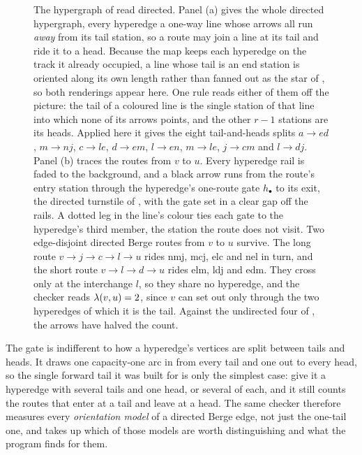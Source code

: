 \begin{figure}[htbp]
{\begin{tikzpicture}
\end{tikzpicture}}
\caption[Directed Berge routes on a whole hypergraph]{The hypergraph
of  read directed. Panel (a) gives the whole directed
hypergraph, every hyperedge a one-way line whose arrows all run \emph{away} from
its tail station, so a route may join a line at its tail and ride it to a head.
Because the map keeps each hyperedge on the track it already occupied, a line
whose tail is an end station is oriented along its own length rather than fanned
out as the star of , so both renderings appear here.
One rule reads either of them off the picture: the tail of a coloured line is the
single station of that line into which none of its arrows points, and the other
$r-1$ stations are its heads. Applied here it gives the eight tail-and-heads
splits $a \to ed$, $m \to nj$, $c \to le$, $d \to em$, $l \to en$, $m \to le$,
$j \to cm$ and $l \to dj$. Panel
(b) traces the routes from $v$ to $u$. Every hyperedge rail is faded to the
background, and a black arrow runs from the route's entry station through the
hyperedge's one-route gate $h_{\bullet}$ to its exit, the directed turnstile of
, with the gate set in a clear gap off the rails. A dotted
leg in the line's colour ties each gate to the hyperedge's third member, the station
the route does not visit. Two edge-disjoint directed Berge routes from $v$ to $u$
survive. The long route
$v \to j \to c \to l \to u$ rides \textcolor{metroB}{nmj}, \textcolor{metroG}{mcj},
\textcolor{metroC}{elc} and \textcolor{metroF}{nel} in turn, and the short route
$v \to l \to d \to u$ rides \textcolor{metroH}{elm}, \textcolor{metroE}{ldj} and
\textcolor{metroD}{edm}. They cross only at the interchange $l$, so they share no
hyperedge, and the checker reads $\lambda(v, u) = 2$, since $v$ can set out only through
the two hyperedges of which it is the tail. Against the undirected four of
, the arrows have halved the count.}
\label{fig:dir-hyper-gadget-example}
\end{figure}

The gate is indifferent to how a hyperedge's vertices are split between tails and heads. It draws one capacity-one arc in from every tail and one out to every head, so the single forward tail it was built for is only the simplest case: give it a hyperedge with several tails and one head, or several of each, and it still counts the routes that enter at a tail and leave at a head. The same checker therefore measures every \emph{orientation model} of a directed Berge edge, not just the one-tail one, and  takes up which of those models are worth distinguishing and what the program finds for them.

